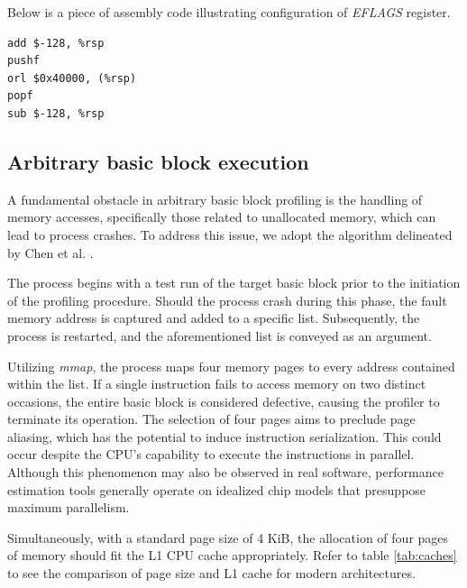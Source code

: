 Below is a piece of assembly code illustrating configuration of \textit{EFLAGS} register.

\begin{lstlisting}
add $-128, %rsp
pushf
orl $0x40000, (%rsp)
popf
sub $-128, %rsp
\end{lstlisting}

\subsection{Arbitrary basic block execution}

A fundamental obstacle in arbitrary basic block profiling is the handling of memory accesses, specifically those related to unallocated memory, which can lead to process crashes. To address this issue, we adopt the algorithm delineated by Chen et al. \cite{chenBHiveBenchmarkSuite2019}.

The process begins with a test run of the target basic block prior to the initiation of the profiling procedure. Should the process crash during this phase, the fault memory address is captured and added to a specific list. Subsequently, the process is restarted, and the aforementioned list is conveyed as an argument.

Utilizing \textit{mmap}, the process maps four memory pages to every address contained within the list. If a single instruction fails to access memory on two distinct occasions, the entire basic block is considered defective, causing the profiler to terminate its operation. The selection of four pages aims to preclude page aliasing, which has the potential to induce instruction serialization. This could occur despite the CPU's capability to execute the instructions in parallel. Although this phenomenon may also be observed in real software, performance estimation tools generally operate on idealized chip models that presuppose maximum parallelism.

Simultaneously, with a standard page size of 4 KiB, the allocation of four pages of memory should fit the L1 CPU cache appropriately. Refer to table \ref{tab:caches} to see the comparison of page size and L1 cache for modern architectures.

